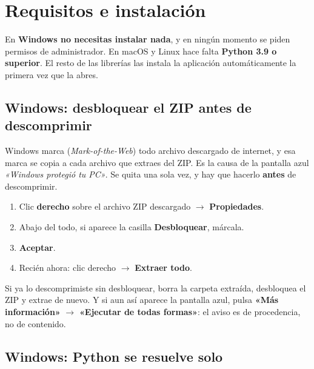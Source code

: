 \documentclass[11pt,a4paper]{article}
\begin{document}
\section{Requisitos e instalación}

En \textbf{Windows no necesitas instalar nada}, y en ningún momento se piden
permisos de administrador. En macOS y Linux hace falta \textbf{Python 3.9 o
superior}. El resto de las librerías las instala la aplicación automáticamente
la primera vez que la abres.

\subsection{Windows: desbloquear el ZIP antes de descomprimir}
\label{sec:desbloquear}

Windows marca (\emph{Mark-of-the-Web}) todo archivo descargado de internet, y
esa marca se copia a cada archivo que extraes del ZIP. Es la causa de la
pantalla azul \emph{«Windows protegió tu PC»}. Se quita una sola vez, y hay que
hacerlo \textbf{antes} de descomprimir.

\begin{receta}
  \begin{enumerate}
    \item Clic \textbf{derecho} sobre el archivo ZIP descargado
      $\rightarrow$ \textbf{Propiedades}.
    \item Abajo del todo, si aparece la casilla \textbf{Desbloquear}, márcala.
    \item \textbf{Aceptar}.
    \item Recién ahora: clic derecho $\rightarrow$ \textbf{Extraer todo}.
  \end{enumerate}
\end{receta}

\begin{obs}
  Si ya lo descomprimiste sin desbloquear, borra la carpeta extraída,
  desbloquea el ZIP y extrae de nuevo. Y si aun así aparece la pantalla azul,
  pulsa \textbf{«Más información»} $\rightarrow$ \textbf{«Ejecutar de todas
  formas»}: el aviso es de procedencia, no de contenido.
\end{obs}

\subsection{Windows: Python se resuelve solo}
\end{document}
